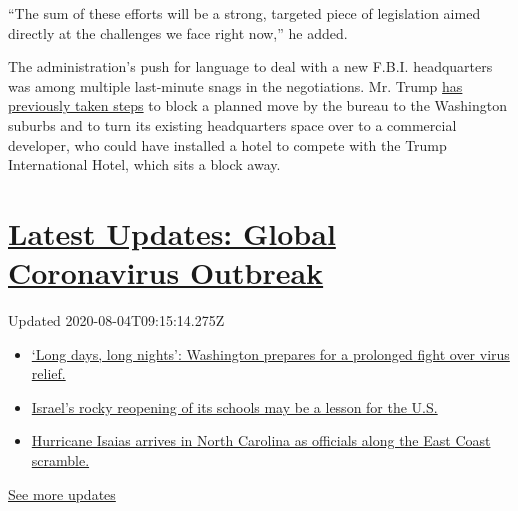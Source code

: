 ``The sum of these efforts will be a strong, targeted piece of
legislation aimed directly at the challenges we face right now,'' he
added.

The administration's push for language to deal with a new F.B.I.
headquarters was among multiple last-minute snags in the negotiations.
Mr. Trump
\href{https://www.nytimes.com/2018/10/18/us/politics/fbi-headquarters-building-trump.html}{has
previously taken steps} to block a planned move by the bureau to the
Washington suburbs and to turn its existing headquarters space over to a
commercial developer, who could have installed a hotel to compete with
the Trump International Hotel, which sits a block away.

\hypertarget{latest-updates-global-coronavirus-outbreak}{%
\section{\texorpdfstring{\href{https://www.nytimes.com/2020/08/04/world/coronavirus-covid-19.html?action=click\&pgtype=Article\&state=default\&region=MAIN_CONTENT_1\&context=storylines_live_updates}{Latest
Updates: Global Coronavirus
Outbreak}}{Latest Updates: Global Coronavirus Outbreak}}\label{latest-updates-global-coronavirus-outbreak}}

Updated 2020-08-04T09:15:14.275Z

\begin{itemize}
\tightlist
\item
  \href{https://www.nytimes.com/2020/08/04/world/coronavirus-covid-19.html?action=click\&pgtype=Article\&state=default\&region=MAIN_CONTENT_1\&context=storylines_live_updates\#link-6b644638}{`Long
  days, long nights': Washington prepares for a prolonged fight over
  virus relief.}
\item
  \href{https://www.nytimes.com/2020/08/04/world/coronavirus-covid-19.html?action=click\&pgtype=Article\&state=default\&region=MAIN_CONTENT_1\&context=storylines_live_updates\#link-7af9fca0}{Israel's
  rocky reopening of its schools may be a lesson for the U.S.}
\item
  \href{https://www.nytimes.com/2020/08/04/world/coronavirus-covid-19.html?action=click\&pgtype=Article\&state=default\&region=MAIN_CONTENT_1\&context=storylines_live_updates\#link-33bf9168}{Hurricane
  Isaias arrives in North Carolina as officials along the East Coast
  scramble.}
\end{itemize}

\href{https://www.nytimes.com/2020/08/04/world/coronavirus-covid-19.html?action=click\&pgtype=Article\&state=default\&region=MAIN_CONTENT_1\&context=storylines_live_updates}{See
more updates}

